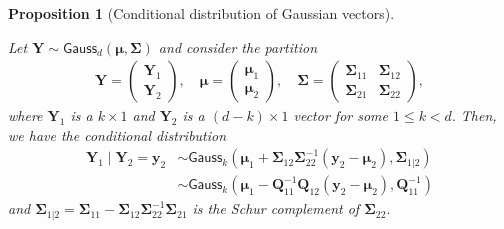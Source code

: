 \documentclass[
  11pt,
  letterpaper,
]{scrbook}
\theoremstyle{definition}
\theoremstyle{plain}
\newtheorem{proposition}{Proposition}[chapter]
\theoremstyle{plain}
\theoremstyle{plain}
\theoremstyle{definition}
\theoremstyle{definition}
\theoremstyle{plain}
\newtheorem{proposition}{Proposition}[chapter]
\theoremstyle{plain}
\theoremstyle{remark}
\begin{document}
\begin{proposition}[Conditional distribution of Gaussian
vectors]\protect\hypertarget{prp-conditional-gaussian}{}\label{prp-conditional-gaussian}

Let
\(\boldsymbol{Y} \sim \mathsf{Gauss}_d(\boldsymbol{\mu}, \boldsymbol{\Sigma})\)
and consider the partition \begin{align*}
 \boldsymbol{Y} = \begin{pmatrix} \boldsymbol{Y}_1 \\ \boldsymbol{Y}_2\end{pmatrix}, \quad 
 \boldsymbol{\mu} = \begin{pmatrix} \boldsymbol{\mu}_1 \\ \boldsymbol{\mu}_2\end{pmatrix}, \quad 
 \boldsymbol{\Sigma} = \begin{pmatrix} \boldsymbol{\Sigma}_{11} & \boldsymbol{\Sigma}_{12}\\ \boldsymbol{\Sigma}_{21} & \boldsymbol{\Sigma}_{22}\end{pmatrix},
\end{align*} where \(\boldsymbol{Y}_1\) is a \(k \times 1\) and
\(\boldsymbol{Y}_2\) is a \((d-k) \times 1\) vector for some
\(1\leq k < d.\) Then, we have the conditional distribution
\begin{align*}
\boldsymbol{Y}_1 \mid \boldsymbol{Y}_2 =\boldsymbol{y}_2 &\sim \mathsf{Gauss}_k(\boldsymbol{\mu}_1+\boldsymbol{\Sigma}_{12} \boldsymbol{\Sigma}_{22}^{-1}(\boldsymbol{y}_2-\boldsymbol{\mu}_2), \boldsymbol{\Sigma}_{1|2})
\\& \sim  \mathsf{Gauss}_k(\boldsymbol{\mu}_1-\boldsymbol{Q}_{11}^{-1}\boldsymbol{Q}_{12}(\boldsymbol{y}_2-\boldsymbol{\mu}_2), \boldsymbol{Q}^{-1}_{11})
\end{align*} and
\(\boldsymbol{\Sigma}_{1|2}=\boldsymbol{\Sigma}_{11}-\boldsymbol{\Sigma}_{12}\boldsymbol{\Sigma}_{22}^{-1}\boldsymbol{\Sigma}_{21}\)
is the Schur complement of \(\boldsymbol{\Sigma}_{22}.\)

\end{proposition}
\end{document}
